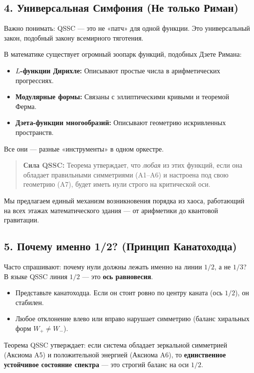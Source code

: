 \documentclass{article}
\numberwithin{equation}{section}
\theoremstyle{plain}
\theoremstyle{definition}
\theoremstyle{remark}
\begin{document}
\subsection*{4. Универсальная Симфония (Не только Риман)}

Важно понимать: QSSC — это не «патч» для одной функции. Это универсальный закон, подобный закону всемирного тяготения.

В математике существует огромный зоопарк функций, подобных Дзете Римана:
\begin{itemize}
    \item \textbf{$L$-функции Дирихле:} Описывают простые числа в арифметических прогрессиях.
    \item \textbf{Модулярные формы:} Связаны с эллиптическими кривыми и теоремой Ферма.
    \item \textbf{Дзета-функции многообразий:} Описывают геометрию искривленных пространств.
\end{itemize}

Все они — разные «инструменты» в одном оркестре.
\begin{quote}
\textbf{Сила QSSC:} Теорема утверждает, что \emph{любая} из этих функций, если она обладает правильными симметриями (A1–A6) и настроена под свою геометрию (A7), будет иметь нули строго на критической оси.
\end{quote}
Мы предлагаем единый механизм возникновения порядка из хаоса, работающий на всех этажах математического здания — от арифметики до квантовой гравитации.

\subsection*{5. Почему именно 1/2? (Принцип Канатоходца)}

Часто спрашивают: почему нули должны лежать именно на линии $1/2$, а не $1/3$?
В языке QSSC линия $1/2$ — это \textbf{ось равновесия}.
\begin{itemize}
    \item Представьте канатоходца. Если он стоит ровно по центру каната (ось $1/2$), он стабилен.
    \item Любое отклонение влево или вправо нарушает симметрию (баланс хиральных форм $W_+ \neq W_-$).
\end{itemize}
Теорема QSSC утверждает: если система обладает зеркальной симметрией (Аксиома A5) и положительной энергией (Аксиома A6), то \textbf{единственное устойчивое состояние спектра} — это строгий баланс на оси $1/2$.
\end{document}
